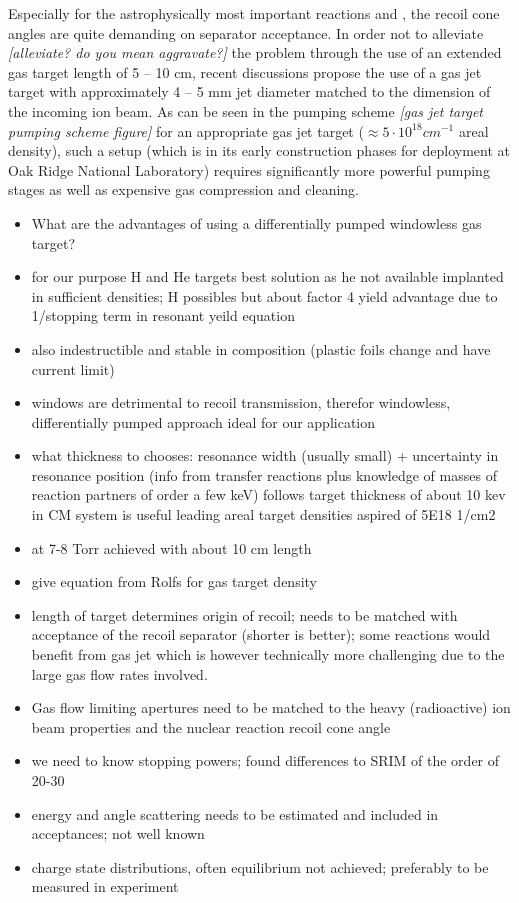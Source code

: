 Especially for the astrophysically most important reactions \reac{\alpha}{\gamma} and \reac{\alpha}{\gamma}, the recoil cone angles are quite demanding on separator acceptance. In order not to alleviate \emph{[alleviate? do you mean aggravate?]} the problem through the use of an extended gas target length of 5 -- 10 cm, recent discussions propose the use of a gas jet target with approximately 4 -- 5 mm jet diameter matched to the dimension of the incoming ion beam. As can be seen in the pumping scheme \emph{[gas jet target pumping scheme figure]} for an appropriate gas jet target ($\approx 5\cdot10^{18} \unit{cm^{-1}}$ areal density), such a setup (which is in its early construction phases for deployment at Oak Ridge National Laboratory) requires significantly more powerful pumping stages as well as expensive gas compression and cleaning.\\
 

\small
\begin{itemize} 
\item What are the advantages of using a differentially pumped windowless gas target?
\item for our purpose H and He targets best solution as he not available implanted in sufficient densities; H possibles but about factor 4 yield advantage due to 1/stopping term in resonant yeild equation
\item also indestructible and stable in composition (plastic foils change and have current limit)
\item windows are detrimental to recoil transmission, therefor windowless, differentially pumped approach ideal for our application
\item what thickness to chooses: resonance width (usually small) + uncertainty in resonance position (info from transfer reactions plus knowledge of masses of reaction partners of order a few keV) follows target thickness of about 10 kev in CM system is useful leading areal target densities aspired of 5E18 1/cm2
\item at 7-8 Torr achieved with about 10 cm length
\item give equation from Rolfs for gas target density
\item  length of target determines origin of recoil; needs to be matched with acceptance of the recoil separator (shorter is better); some reactions would benefit from gas jet which is however technically more challenging due to the large gas flow rates involved.
\item Gas flow limiting apertures need to be matched to the heavy (radioactive) ion beam properties and the nuclear reaction recoil cone angle
\item we need to know stopping powers; found differences to SRIM of the order of 20-30%
\item energy and angle scattering needs to be estimated and included in acceptances; not well known
\item charge state distributions, often equilibrium not achieved; preferably to be measured in experiment
\end{itemize}
\normalsize

